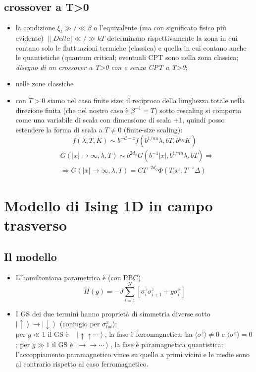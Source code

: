 \documentclass[a4paper,11pt]{article}
\newcommand{\mean}[1]{\ensuremath{\langle #1 \rangle}}
\newcommand{\ket}[1]{\left | #1 \right \rangle}
\newcommand{\csi}{\xi}
\newcommand{\ssection}[2]{\vspace{0.5 cm} \section{ \texorpdfstring{\textbf{#1}}{#2} }}
\newcommand{\ssubsection}[1]{\vspace{0.2cm} \subsection{#1}}
\begin{document}
\ssubsection{crossover a T>0}
\begin{itemize}
 \item la condizione $\csi_t \gg/\ll \beta$ o l'equivalente (ma con significato fisico più evidente) $\|Delta| \ll/\gg kT$ determinano rispettivamente la zona in cui contano solo le fluttuazioni termiche (classica) e quella in cui contano anche le quantistiche (quantum critical; eventuali CPT sono nella zona classica;\\ \emph{disegno di un crossover a T>0 con e senza CPT a T>0};
 \item nelle zone classiche
 \item con $T>0$ siamo nel caso finite size; il reciproco della lunghezza totale nella direzione finita (che nel nostro caso è $\beta^{-1}=T$) sotto rescaling si comporta come una variabile di scala con dimensione di scala +1, quindi posso estendere la forma di scala a $T\neq 0$ (finite-size scaling): 
 	\[ f(\lambda,T,K) \sim b^{-d-z} f(b^{1/nu}\lambda,bT,b^{y_K}K) \]
 	\begin{align*} &G(|x|\to\infty,\lambda,T) \sim b^{2d_{\phi}} G(b^{-1}|x|,b^{1/nu}\lambda,bT) \Rightarrow \\ &\Rightarrow G(|x|\to\infty,\lambda,T)=CT^{-2d_{\phi}}\Phi(T|x|, T^{-z}\Delta)\end{align*}
\end{itemize}

\ssection{Modello di Ising 1D in campo trasverso}{Modello di Ising 1D in campo trasverso}
\ssubsection{Il modello}
\begin{itemize}
 \item L'hamiltoniana parametrica è (con PBC) \[H(g) = -J\sum_{i=1}^N\left[\sigma_i^z\sigma_{i+1}^z + g\sigma_i^x\right]\] 
 \item I GS dei due termini hanno proprietà di simmetria diverse sotto $\ket{\uparrow} \to \ket{\downarrow}$ (coniugio per $\sigma_{tot}^x$); \\per $g\ll 1$ il GS è ~ $\ket{\uparrow\uparrow\cdots}$, la fase è ferromagnetica: ha $\mean{\sigma^z}\neq 0$ e $\mean{\sigma^x}=0$; per $g\gg 1$ il GS è $\ket{\rightarrow\rightarrow\cdots}$, la fase è paramagnetica quantistica: l'accoppiamento paramagnetico vince su quello a primi vicini e le medie sono al contrario rispetto al caso ferromagnetico.
\end{itemize}
\end{document}
